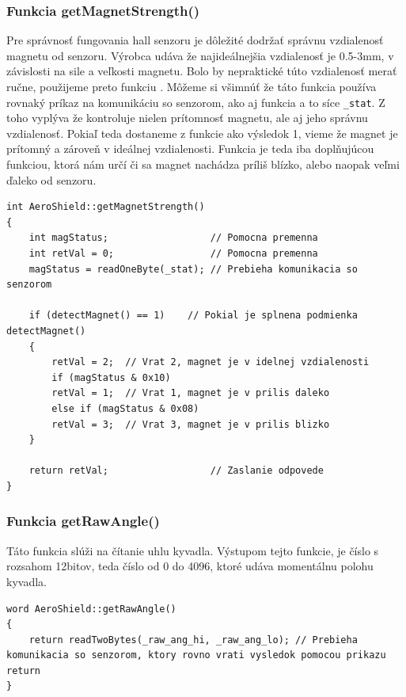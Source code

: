 \subsubsection{Funkcia getMagnetStrength()}

Pre správnosť fungovania hall senzoru je dôležité dodržať správnu vzdialenosť magnetu od senzoru. Výrobca udáva že najideálnejšia vzdialenosť je 0.5-3mm, v závislosti na sile a veľkosti magnetu. Bolo by nepraktické túto vzdialenosť merať ručne, použijeme preto funkciu . Môžeme si všimnúť že táto funkcia používa rovnaký príkaz na komunikáciu so senzorom, ako aj funkcia  a to síce \verb|_stat|. Z toho vyplýva že  kontroluje nielen prítomnosť magnetu, ale aj jeho správnu vzdialenosť. Pokiaľ teda dostaneme z funkcie  ako výsledok 1, vieme že magnet je prítomný a zároveň v ideálnej vzdialenosti. Funkcia  je teda iba doplňujúcou funkciou, ktorá nám určí či sa magnet nachádza príliš blízko, alebo naopak veľmi ďaleko od senzoru. 

\begin{lstlisting}[caption={Zdrojový kód funkcie getMagnetStrength.},captionpos=b]
int AeroShield::getMagnetStrength()   
{
	int magStatus;                  // Pomocna premenna 
	int retVal = 0;                 // Pomocna premenna
	magStatus = readOneByte(_stat);	// Prebieha komunikacia so senzorom       
	
	if (detectMagnet() == 1)	// Pokial je splnena podmienka detectMagnet()
	{
		retVal = 2;  // Vrat 2, magnet je v idelnej vzdialenosti
		if (magStatus & 0x10)
		retVal = 1;  // Vrat 1, magnet je v prilis daleko
		else if (magStatus & 0x08)
		retVal = 3;  // Vrat 3, magnet je v prilis blizko
	}
	
	return retVal;                  // Zaslanie odpovede  
}
\end{lstlisting}

\subsubsection{Funkcia getRawAngle()}

Táto funkcia slúži na čítanie uhlu kyvadla. Výstupom tejto funkcie, je číslo s rozsahom 12bitov, teda číslo od 0 do 4096, ktoré udáva momentálnu polohu kyvadla. 

\begin{lstlisting}[caption={Zdrojový kód funkcie getRawAngle.},captionpos=b]
word AeroShield::getRawAngle() 
{
	return readTwoBytes(_raw_ang_hi, _raw_ang_lo); // Prebieha komunikacia so senzorom, ktory rovno vrati vysledok pomocou prikazu return 
}
\end{lstlisting}

